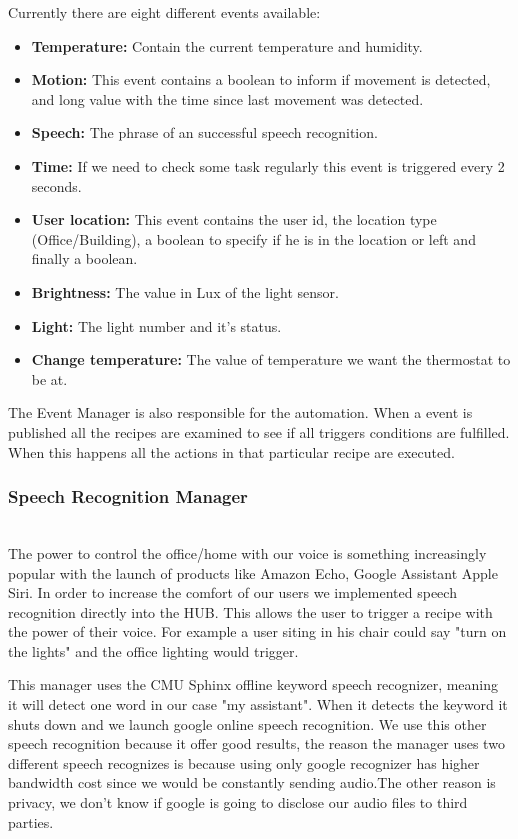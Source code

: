 Currently there are eight different events available:

\begin{itemize}
  \item \textbf{Temperature:} Contain the current temperature and humidity.
  \item \textbf{Motion:} This event contains a boolean to inform if movement is detected, and long value with the time since last movement was detected.
  \item \textbf{Speech:} The phrase of an successful speech recognition.  
  \item \textbf{Time:} If we need to check some task regularly this event is triggered every 2 seconds.  
  \item \textbf{User location:} This event contains the user id, the location type (Office/Building), a boolean to specify if he is in the location or left and finally a boolean.
  \item \textbf{Brightness:} The value in Lux of the light sensor.  
  \item \textbf{Light:} The light number and it's status. 
  \item \textbf{Change temperature:} The value of temperature we want the thermostat to be at. 
  
\end{itemize}


The Event Manager is also responsible for the automation. When a event is published all the recipes are examined to see if all triggers conditions are fulfilled. When this happens all the actions in that particular recipe are executed.


\subsubsection{Speech Recognition Manager}\mbox{}\\

The power to control the office/home with our voice is something increasingly popular with the launch of products like Amazon Echo, Google Assistant Apple Siri. In order to increase the comfort of our users we implemented speech recognition directly into the HUB. This allows the user to trigger a recipe with the power of their voice. For example a user siting in his chair could say "turn on the lights" and the office lighting would trigger. 

This manager uses the CMU Sphinx offline keyword speech recognizer, meaning it will detect one word in our case "my assistant". When it detects the keyword it shuts down and we launch google online speech recognition. We use this other speech recognition because it offer good results, the reason the manager uses two different speech recognizes is because using only google recognizer has higher bandwidth cost since we would be constantly sending audio.The other reason is privacy, we don't know if google is going to disclose our audio files to third parties.

